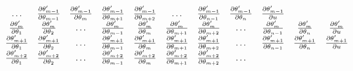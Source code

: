 \begin{equation}
\begin{split}
\begin{array}{ccccccccccc}
        \ldots &
        \frac{\partial \parameter[m-1]\proposed}{\partial \parameter[m-1]} &
        \frac{\partial \parameter[m-1]\proposed}{\partial \parameter[m]} &
        \frac{\partial \parameter[m-1]\proposed}{\partial \parameter[m+1]} &
        \frac{\partial \parameter[m-1]\proposed}{\partial \parameter[m+2]} &
        \ldots &
        \frac{\partial \parameter[m-1]\proposed}{\partial \parameter[n-1]} &
        \frac{\partial \parameter[m-1]\proposed}{\partial \parameter[n]} &
        \frac{\partial \parameter[m-1]\proposed}{\partial \uniformdeviate} \\
        \frac{\partial \parameter[m]\proposed}{\partial \parameter[1]} &
        \frac{\partial \parameter[m]\proposed}{\partial \parameter[2]} &
        \ldots &
        \frac{\partial \parameter[m]\proposed}{\partial \parameter[m-1]} &
        \frac{\partial \parameter[m]\proposed}{\partial \parameter[m]} &
        \frac{\partial \parameter[m]\proposed}{\partial \parameter[m+1]} &
        \frac{\partial \parameter[m]\proposed}{\partial \parameter[m+2]} &
        \ldots &
        \frac{\partial \parameter[m]\proposed}{\partial \parameter[n-1]} &
        \frac{\partial \parameter[m]\proposed}{\partial \parameter[n]} &
        \frac{\partial \parameter[m]\proposed}{\partial \uniformdeviate} \\
        \frac{\partial \parameter[m+1]\proposed}{\partial \parameter[1]} &
        \frac{\partial \parameter[m+1]\proposed}{\partial \parameter[2]} &
        \ldots &
        \frac{\partial \parameter[m+1]\proposed}{\partial \parameter[m-1]} &
        \frac{\partial \parameter[m+1]\proposed}{\partial \parameter[m]} &
        \frac{\partial \parameter[m+1]\proposed}{\partial \parameter[m+1]} &
        \frac{\partial \parameter[m+1]\proposed}{\partial \parameter[m+2]} &
        \ldots &
        \frac{\partial \parameter[m+1]\proposed}{\partial \parameter[n-1]} &
        \frac{\partial \parameter[m+1]\proposed}{\partial \parameter[n]} &
        \frac{\partial \parameter[m+1]\proposed}{\partial \uniformdeviate} \\
        \frac{\partial \parameter[m+2]\proposed}{\partial \parameter[1]} &
        \frac{\partial \parameter[m+2]\proposed}{\partial \parameter[2]} &
        \ldots &
        \frac{\partial \parameter[m+2]\proposed}{\partial \parameter[m-1]} &
        \frac{\partial \parameter[m+2]\proposed}{\partial \parameter[m]} &
        \frac{\partial \parameter[m+2]\proposed}{\partial \parameter[m+1]} &
        \frac{\partial \parameter[m+2]\proposed}{\partial \parameter[m+2]} &
        \ldots &

\end{array}
\end{split}
\end{equation}
